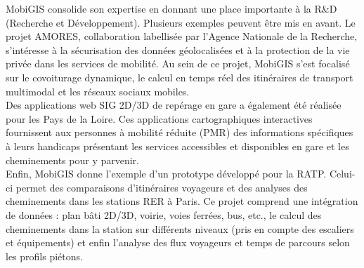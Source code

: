 MobiGIS consolide son expertise en donnant une place importante à la R\&D (Recherche et Développement). Plusieurs exemples peuvent être mis en avant. 
Le projet AMORES, collaboration labellisée par l’Agence Nationale de la Recherche, s’intéresse à la sécurisation des données géolocalisées et à la protection de la vie privée dans les services de mobilité. Au sein de ce projet, MobiGIS s’est focalisé sur le covoiturage dynamique, le calcul en temps réel des itinéraires de transport multimodal et les réseaux sociaux mobiles.\\ 
Des applications web SIG 2D/3D de repérage en gare a également été réalisée pour les Pays de la Loire. Ces applications cartographiques interactives fournissent aux personnes à mobilité réduite (PMR) des informations spécifiques à leurs handicaps présentant les services accessibles et disponibles en gare et les cheminements pour y parvenir. \\
Enfin, MobiGIS donne l’exemple d’un prototype développé pour la RATP. Celui-ci permet des comparaisons d’itinéraires voyageurs et des analyses des cheminements dans les stations RER à Paris. Ce projet comprend une intégration de données : plan bâti 2D/3D, voirie, voies ferrées, bus, etc., le calcul des cheminements dans la station sur différents niveaux (pris en compte des escaliers et équipements) et enfin l’analyse des flux voyageurs et temps de parcours selon les profils piétons. 

